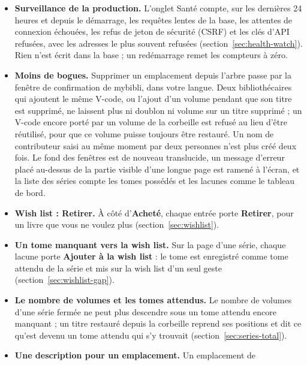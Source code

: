\begin{itemize}
        semble être celle d'une autre bibliothèque. Sur une bibliothèque
        existante, le premier contrôle liste les fichiers laissés par
        les titres purgés de la corbeille : c'est attendu.
  \item \textbf{Surveillance de la production.} L'onglet Santé compte,
        sur les dernières 24 heures et depuis le démarrage, les requêtes
        lentes de la base, les attentes de connexion échouées, les refus
        de jeton de sécurité (CSRF) et les clés d'API refusées, avec les
        adresses le plus souvent refusées
        (section~\ref{sec:health-watch}). Rien n'est écrit dans la base ;
        un redémarrage remet les compteurs à zéro.
  \item \textbf{Moins de bogues.} Supprimer un emplacement depuis
        l'arbre passe par la fenêtre de confirmation de mybibli, dans
        votre langue. Deux bibliothécaires qui ajoutent le même V-code,
        ou l'ajout d'un volume pendant que son titre est supprimé, ne
        laissent plus ni doublon ni volume sur un titre supprimé ; un
        V-code encore porté par un volume de la corbeille est refusé au
        lieu d'être réutilisé, pour que ce volume puisse toujours être
        restauré. Un nom de contributeur saisi au même moment par deux
        personnes n'est plus créé deux fois. Le fond des fenêtres est de
        nouveau translucide, un message d'erreur placé au-dessus de la
        partie visible d'une longue page est ramené à l'écran, et la
        liste des séries compte les tomes possédés et les lacunes comme
        le tableau de bord.
  \item \textbf{Wish list : Retirer.} À côté d'\textbf{Acheté}, chaque
        entrée porte \textbf{Retirer}, pour un livre que vous ne voulez
        plus (section~\ref{sec:wishlist}).
  \item \textbf{Un tome manquant vers la wish list.} Sur la page d'une
        série, chaque lacune porte \textbf{Ajouter à la wish list} : le
        tome est enregistré comme tome attendu de la série et mis sur la
        wish list d'un seul geste (section~\ref{sec:wishlist-gap}).
  \item \textbf{Le nombre de volumes et les tomes attendus.} Le nombre de
        volumes d'une série fermée ne peut plus descendre sous un tome
        attendu encore manquant ; un titre restauré depuis la corbeille
        reprend ses positions et dit ce qu'est devenu un tome attendu
        qui s'y trouvait (section~\ref{sec:series-total}).
  \item \textbf{Une description pour un emplacement.} Un emplacement de

\end{itemize}
